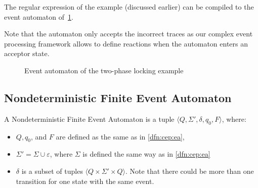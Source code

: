 	
			The regular expression of the example (discussed earlier) can be compiled to the event automaton of~\cref{fig:cep:fa}. 
	
			Note that the automaton only accepts the incorrect traces as our complex event processing framework allows to define reactions when the automaton enters an acceptor state.
			
				
				\begin{figure}[h]
					\centering
					\caption{Event automaton of the two-phase locking example}
					\label{fig:cep:fa}
				\end{figure}

			

		\subsection{Nondeterministic Finite Event Automaton}
		
		\begin{dfn}	
			\label{dfn:cep:nea}
			A Nondeterministic Finite Event Automaton is a tuple $\langle Q,\Sigma',\delta,q_0, F \rangle$, where:
			\begin{itemize}
				\item $Q, q_0$, and $F$ are defined as the same as in \cref{dfn:cep:ea},
				\item $\Sigma' = \Sigma \cup \varepsilon$, where $\Sigma$ is defined the same way as in \cref{dfn:cep:ea}
				\item $\delta$ is a subset of tuples $\langle Q \times \Sigma' \times Q \rangle$.
				Note that there could be more than one transition for one state with the same event.
			\end{itemize}
		\end{dfn}
	
